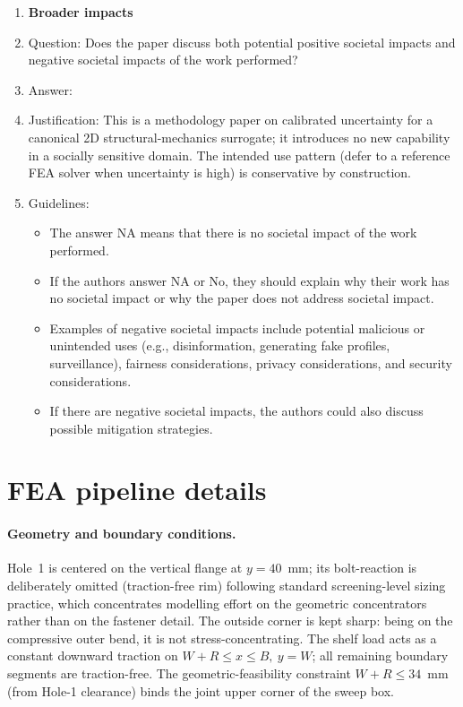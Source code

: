 \documentclass{article}
\begin{document}
\begin{enumerate}
\item {\bf Broader impacts}
    \item[] Question: Does the paper discuss both potential positive societal impacts and negative societal impacts of the work performed?
    \item[] Answer: \answerNA{}
    \item[] Justification: This is a methodology paper on calibrated uncertainty for a canonical 2D structural-mechanics surrogate; it introduces no new capability in a socially sensitive domain. The intended use pattern (defer to a reference FEA solver when uncertainty is high) is conservative by construction.
    \item[] Guidelines:
    \begin{itemize}
        \item The answer NA means that there is no societal impact of the work performed.
        \item If the authors answer NA or No, they should explain why their work has no societal impact or why the paper does not address societal impact.
        \item Examples of negative societal impacts include potential malicious or unintended uses (e.g., disinformation, generating fake profiles, surveillance), fairness considerations, privacy considerations, and security considerations.
        \item If there are negative societal impacts, the authors could also discuss possible mitigation strategies.
    \end{itemize}

\end{enumerate}

\newpage
\appendix

\section{FEA pipeline details}
\label{app:fea}

\paragraph{Geometry and boundary conditions.} Hole~1 is centered on the
vertical flange at $y=40$~mm; its bolt-reaction is deliberately omitted
(traction-free rim) following standard screening-level sizing practice,
which concentrates modelling effort on the geometric concentrators
rather than on the fastener detail. The outside corner is kept sharp:
being on the compressive outer bend, it is not stress-concentrating.
The shelf load acts as a constant downward traction on $W+R \leq x \leq
B,\ y=W$; all remaining boundary segments are traction-free. The
geometric-feasibility constraint $W+R \leq 34$~mm (from Hole-1 clearance)
binds the joint upper corner of the sweep box.
\end{document}
